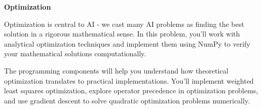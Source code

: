 \item {\bf Optimization}


Optimization is central to AI - we cast many AI problems as finding the best solution in a rigorous mathematical sense. In this problem, you'll work with analytical optimization techniques and implement them using NumPy to verify your mathematical solutions computationally.

The programming components will help you understand how theoretical optimization translates to practical implementations. You'll implement weighted least squares optimization, explore operator precedence in optimization problems, and use gradient descent to solve quadratic optimization problems numerically.

\begin{enumerate}

  

  

  

\end{enumerate}
